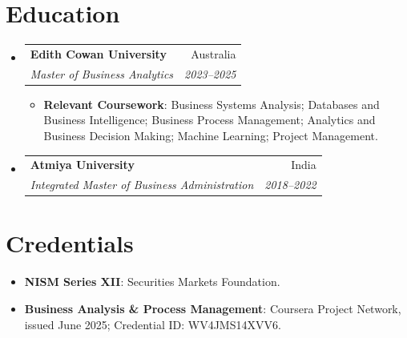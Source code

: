 \documentclass[letterpaper,9.5pt]{article}
\makeatletter
\newcommand{\resumeItem}[2]{
  \item\small{
    \textbf{#1}{: #2 \vspace{-2pt}}
  }
}
\newcommand{\resumeSubheading}[4]{
  \vspace{-1pt}\item
    \begin{tabular*}{0.97\textwidth}{l@{\extracolsep{\fill}}r}
      \textbf{#1} & #2 \\
      \textit{\small #3} & \textit{\small #4} \\
    \end{tabular*}\vspace{-5pt}
}
\newcommand{\resumeSubItem}[2]{\resumeItem{#1}{#2}\vspace{-4pt}}
\newcommand{\resumeSubHeadingListStart}{\begin{itemize}[leftmargin=*]}
\newcommand{\resumeSubHeadingListEnd}{\end{itemize}}
\newcommand{\resumeItemListStart}{\begin{itemize}}
\newcommand{\resumeItemListEnd}{\end{itemize}\vspace{-5pt}}
\makeatother
\begin{document}
\section{Education}
\resumeSubHeadingListStart
  \resumeSubheading
    {Edith Cowan University}{Australia}
    {Master of Business Analytics}{2023--2025}
    \resumeItemListStart
      \resumeItem{Relevant Coursework}
        {Business Systems Analysis; Databases and Business Intelligence; Business Process Management; Analytics and Business Decision Making; Machine Learning; Project Management.}
    \resumeItemListEnd
  \resumeSubheading
    {Atmiya University}{India}
    {Integrated Master of Business Administration}{2018--2022}
\resumeSubHeadingListEnd

\section{Credentials}
\vspace{-2pt}
\resumeSubHeadingListStart
  \resumeSubItem{NISM Series XII}
    {Securities Markets Foundation.}
  \resumeSubItem{Business Analysis \& Process Management}
    {Coursera Project Network, issued June 2025; Credential ID: WV4JMS14XVV6.}
\resumeSubHeadingListEnd
\end{document}
